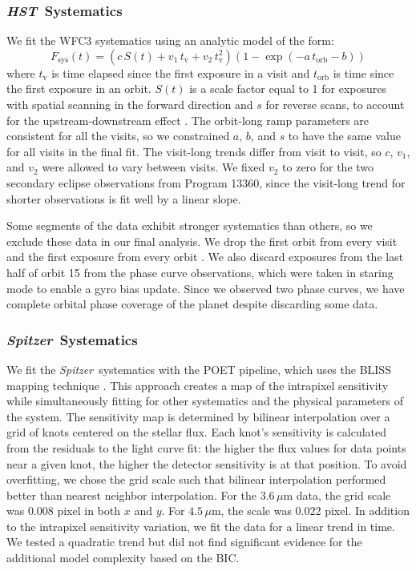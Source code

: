 \documentclass[twocolumn]{aastex61}
\newcommand{\project}[1]{\textsl{#1}}
\newcommand{\HST}{\project{HST}}
\newcommand{\Spitzer}{\project{Spitzer}}
\begin{document}
\subsubsection{\HST\ Systematics}
\label{sec:hst_sys}
We fit the WFC3 systematics using an analytic model of the form:
\begin{equation}
 F_\mathrm{sys}(t) = (c\,S(t) + v_1\,t_\mathrm{v} + v_2\,t_\mathrm{v}^2)(1 - \exp(-a\,t_\mathrm{orb} - b))
\end{equation}
where $t_\mathrm{v}$ is time elapsed since the first exposure in a visit and $t_\mathrm{orb}$ is time since the first exposure in an orbit. $S(t)$ is a scale factor equal to 1 for exposures with spatial scanning in the forward direction and $s$ for reverse scans, to account for the upstream-downstream effect \citep{mccullough12}. The orbit-long ramp parameters are consistent for all the visits, so we constrained $a$, $b$, and $s$ to have the same value for all visits in the final fit. The visit-long trends differ from visit to visit, so $c$, $v_1$, and $v_2$ were allowed to vary between visits. We fixed $v_2$ to zero for the two secondary eclipse observations from Program 13360, since the visit-long trend for shorter observations is fit well by a linear slope.

Some segments of the data exhibit stronger systematics than others, so we exclude these data in our final analysis. We drop the first orbit from every visit and the first exposure from every orbit \citep[following common practice; see e.g.][]{kreidberg14a}.  We also discard exposures from the last half of orbit 15 from the phase curve observations, which were taken in staring mode to enable a gyro bias update. Since we observed two phase curves, we have complete orbital phase coverage of the planet despite discarding some data.

\subsubsection{\Spitzer\ Systematics}
We fit the \Spitzer\ systematics with the POET pipeline, which uses the BLISS mapping technique \citep{stevenson12}. This approach creates a map of the intrapixel sensitivity while simultaneously fitting for other systematics and the physical parameters of the system. The sensitivity map is determined by bilinear interpolation over a grid of knots centered on the stellar flux. Each knot's sensitivity is calculated from the residuals to the light curve fit: the higher the flux values for data points near a given knot, the higher the detector sensitivity is at that position.  To avoid overfitting, we chose the grid scale such that bilinear interpolation performed better than nearest neighbor interpolation. For the $3.6\,\mu$m data, the grid scale was 0.008 pixel in both $x$ and $y$. For $4.5\,\mu$m, the scale was 0.022 pixel.  In addition to the intrapixel sensitivity variation, we fit the data for a linear trend in time. We tested a quadratic trend but did not find significant evidence for the additional model complexity based on the BIC. 
\end{document}
